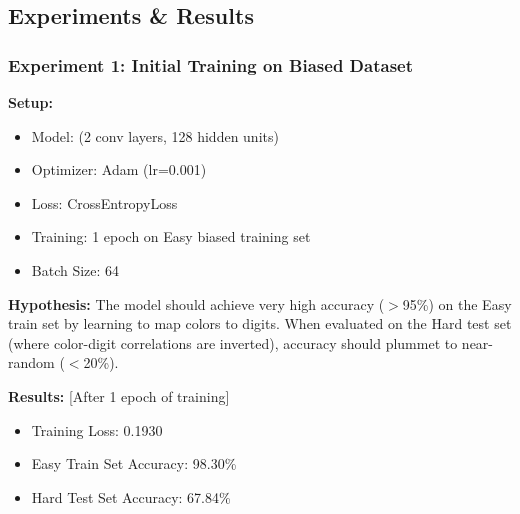 \documentclass[9pt,a4paper,twocolumn,twoside]{tau-class/tau}
\begin{document}
    \subsection{Experiments \& Results}
    
        \subsubsection{Experiment 1: Initial Training on Biased Dataset}
        
        \textbf{Setup:}
        \begin{itemize}
            \item Model:  (2 conv layers, 128 hidden units)
            \item Optimizer: Adam (lr=0.001)
            \item Loss: CrossEntropyLoss
            \item Training: 1 epoch on Easy biased training set
            \item Batch Size: 64
        \end{itemize}
        
        \textbf{Hypothesis:} The model should achieve very high accuracy ($>$95\%) on the Easy train set by learning to map colors to digits. When evaluated on the Hard test set (where color-digit correlations are inverted), accuracy should plummet to near-random ($<$20\%).
        
        \textbf{Results:} [After 1 epoch of training]
        \begin{itemize}
            \item Training Loss: 0.1930
            \item Easy Train Set Accuracy: 98.30\%
            \item Hard Test Set Accuracy: 67.84\%
        \end{itemize}
        
\end{document}
